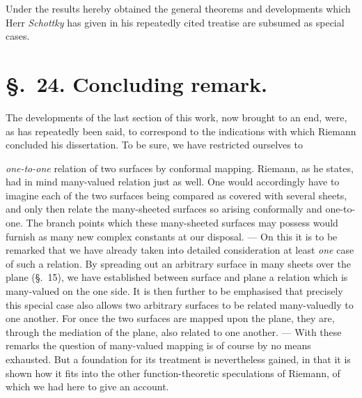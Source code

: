 \documentclass{article}
\begin{document}
Under the results hereby obtained the general theorems and developments which Herr \emph{Schottky} has given in his repeatedly cited treatise are subsumed as special cases.

\section*{§.~24. Concluding remark.}

The developments of the last section of this work, now brought to an end, were, as has repeatedly been said, to correspond to the indications with which Riemann concluded his dissertation. To be sure, we have restricted ourselves to

\emph{one-to-one} relation of two surfaces by conformal mapping. Riemann, as he states, had in mind many-valued relation just as well. One would accordingly have to imagine each of the two surfaces being compared as covered with several sheets, and only then relate the many-sheeted surfaces so arising conformally and one-to-one. The branch points which these many-sheeted surfaces may possess would furnish as many new complex constants at our disposal. --- On this it is to be remarked that we have already taken into detailed consideration at least \emph{one} case of such a relation. By spreading out an arbitrary surface in many sheets over the plane (§.~15), we have established between surface and plane a relation which is many-valued on the one side. It is then further to be emphasised that precisely this special case also allows two arbitrary surfaces to be related many-valuedly to one another. For once the two surfaces are mapped upon the plane, they are, through the mediation of the plane, also related to one another. --- With these remarks the question of many-valued mapping is of course by no means exhausted. But a foundation for its treatment is nevertheless gained, in that it is shown how it fits into the other function-theoretic speculations of Riemann, of which we had here to give an account.
\end{document}
